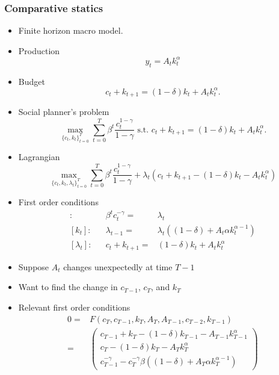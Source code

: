 \documentclass[compress]{beamer}
\begin{document}
\begin{frame}\frametitle{Comparative statics}
  \begin{itemize}
  \item Finite horizon macro model. 
  \item Production
    \[ y_t = A_t k_t^\alpha \]
  \item Budget
    \[ c_t + k_{t+1} = (1-\delta) k_t + A_t k_t^\alpha. \]
  \item Social planner's problem
    \[ \max_{\{c_t,k_t\}_{t=0}^T} \sum_{t=0}^T \beta^t
    \frac{c_t^{1-\gamma}} {1-\gamma}  \text{ s.t. } c_t + k_{t+1} =
    (1-\delta) k_t + A_t k_t^\alpha. \]
  \end{itemize}
\end{frame}

\begin{frame}
  \begin{itemize}
  \item Lagrangian
    \[ \max_{\{c_t,k_t,\lambda_t\}_{t=0}^T} \sum_{t=0}^T \beta^t
    \frac{c_t^{1-\gamma}} {1-\gamma}  + \lambda_t(c_t + k_{t+1} - 
    (1-\delta) k_t - A_t k_t^\alpha) \]
  \item First order conditions
    \begin{align*}
      [c_t]: & & \beta^t c_t^{-\gamma} = & \lambda_t \\
      [k_t]: & & \lambda_{t-1} = & \lambda_t\left((1-\delta) + A_t \alpha
        k_t^{\alpha-1}\right) \\
      [\lambda_t]: & & c_t + k_{t+1} = & (1-\delta) k_t + A_t k_t^\alpha
    \end{align*}
  \end{itemize}
\end{frame}
\begin{frame}
  \begin{itemize}
  \item Suppose $A_t$ changes unexpectedly at time $T-1$ 
  \item Want to find the change in $c_{T-1}$, $c_T$, and $k_T$
  \item Relevant first order conditions
    \begin{align*}
      0 =&  F(c_{T},c_{T-1},k_{T},A_T,A_{T-1},c_{T-2},k_{T-1}) \\
      = & \begin{pmatrix} 
        c_{T-1} + k_{T} - (1-\delta) k_{T-1} - A_{T-1} k_{T-1}^\alpha \\
        c_T - (1-\delta) k_T - A_T k_T^\alpha \\
        c_{T-1}^{-\gamma} - c_T^{-\gamma} \beta \left((1-\delta) +  A_T \alpha k_T^{\alpha-1}\right)
      \end{pmatrix}
    \end{align*}
  \end{itemize}
\end{frame}
\end{document}
